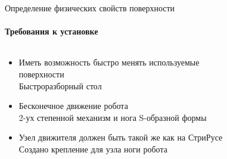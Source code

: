 \documentclass[aspectratio=169,xcolor=table,10pt]{beamer}
\begin{document}
\begin{frame}[t]{Определение физических свойств поверхности}
    \framesubtitle{Требования к установке}
    \vspace{-0.5cm}
    \begin{columns}[T,onlytextwidth]
        \begin{column}{0.57\textwidth}
            \begin{itemize}
                \item Иметь возможность быстро менять используемые поверхности {\\ \alert{Быстроразборный стол}}
                \item Бесконечное движение робота {\\ \alert{2-ух степенной механизм и нога S-образной формы}}
                \item Узел движителя должен быть такой же как на СтриРусе {\\ \alert{Создано крепление для узла ноги робота}}
            \end{itemize}
        \end{column}
        \begin{column}{0.42\textwidth}
            \vspace{-0.8cm}
            \begin{figure}[H]
                \centering
\end{figure}
\end{column}
\end{columns}
\end{frame}
\end{document}
